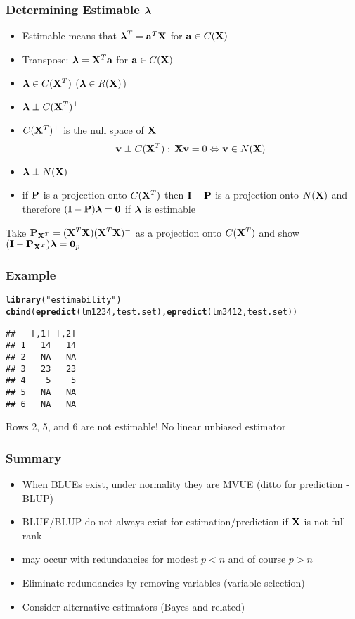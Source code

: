\documentclass[handout]{beamer}\usepackage[]{graphicx}\usepackage[]{color}
\makeatletter
\newcommand{\hlstr}[1]{\textcolor[rgb]{0.192,0.494,0.8}{#1}}%
\newcommand{\hlstd}[1]{\textcolor[rgb]{0.345,0.345,0.345}{#1}}%
\newcommand{\hlkwd}[1]{\textcolor[rgb]{0.737,0.353,0.396}{\textbf{#1}}}%
\newenvironment{kframe}{%
 \def\at@end@of@kframe{}%
 \ifinner\ifhmode%
  \def\at@end@of@kframe{\end{minipage}}%
  \begin{minipage}{\columnwidth}%
 \fi\fi%
 \def\FrameCommand##1{\hskip\@totalleftmargin \hskip-\fboxsep
 \colorbox{shadecolor}{##1}\hskip-\fboxsep
     \hskip-\linewidth \hskip-\@totalleftmargin \hskip\columnwidth}%
 \MakeFramed {\advance\hsize-\width
   \@totalleftmargin\z@ \linewidth\hsize
   \@setminipage}}%
 {\par\unskip\endMakeFramed%
 \at@end@of@kframe}
\newenvironment{knitrout}{}{} %
\makeatother
\begin{document}
\begin{frame} \frametitle{Determining Estimable $\lambdab$}
  \begin{itemize}

 \item Estimable means that $\lambdab^T = \a^T\X$  for $\a \in C(\X)$ \pause
 \item Transpose: $\lambdab = \X^T \a$  for $\a \in C(\X)$ \pause
 \item $\lambdab \in C(\X^T)$ ($\lambdab \in R(\X)$)\pause
 \item $\lambdab \perp C(\X^T)^{\perp}$ \pause
 \item $C(\X^T)^{\perp}$ is the null space of $\X$  \pause
$$ \v \perp C(\X^T): \, \X \v = 0 \Leftrightarrow \v \in N(\X)$$ \pause
\item $\lambdab \perp  N(\X)$ \pause
\item if $\P$ is a projection onto $C(\X^T)$ then $\I - \P$ is a projection
  onto $N(\X)$ and therefore $(\I - \P) \lambdab = \zero$ if $\lambdab$
  is estimable \pause
  \end{itemize}
\vfill
Take $\P_{\X^T} = (\X^T\X)(\X^T\X)^{-}$ as a projection onto $C(\X^T)$
and show $(\I - \P_{\X^T})\lambdab = \zero_p$
\end{frame}

\begin{frame}[fragile]\frametitle{Example}
\begin{knitrout}
\color{fgcolor}\begin{kframe}
\begin{alltt}
\hlkwd{library}\hlstd{(}\hlstr{"estimability"} \hlstd{)}
\hlkwd{cbind}\hlstd{(}\hlkwd{epredict}\hlstd{(lm1234, test.set),} \hlkwd{epredict}\hlstd{(lm3412, test.set))}
\end{alltt}
\begin{verbatim}
##   [,1] [,2]
## 1   14   14
## 2   NA   NA
## 3   23   23
## 4    5    5
## 5   NA   NA
## 6   NA   NA
\end{verbatim}
\end{kframe}
\end{knitrout}

Rows 2, 5, and 6 are not estimable!  No linear unbiased estimator


\end{frame}
\begin{frame} \frametitle{Summary}
  \begin{itemize}
  \item When BLUEs exist,  under normality they are MVUE  (ditto for
    prediction - BLUP) \pause
 \item BLUE/BLUP do not always exist for estimation/prediction if $\X$ is
   not full rank \pause
\item may occur with redundancies for modest $p < n$ and of course $p
  > n$ \pause
\item Eliminate redundancies by removing variables (variable
  selection) \pause
\item Consider alternative estimators (Bayes and related)
  \end{itemize}
\end{frame}
\end{document}

